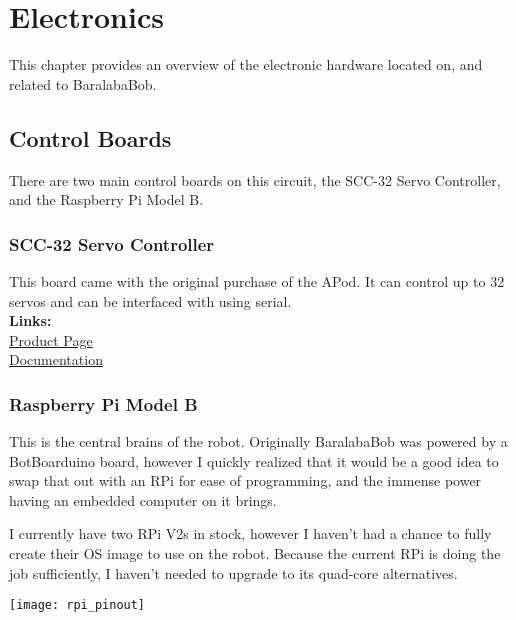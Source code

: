 	\chapter{Electronics}
		This chapter provides an overview of the electronic hardware located on, and related to BaralabaBob.
		\pagebreak
		
		\section{Control Boards}
        	\label{Controllers}
			There are two main control boards on this circuit, the SCC-32 Servo Controller, and the Raspberry Pi Model B.
			
			\subsection{SCC-32 Servo Controller}
				This board came with the original purchase of the APod. It can control up to 32 servos and can be interfaced with using serial.\\
				
				\textbf{Links:}\\
				\href{http://www.lynxmotion.com/p-395-ssc-32-servo-controller.aspx}{Product Page}\\
				\href{http://www.lynxmotion.com/s/html/build136.htm}{Documentation}
				
			\subsection{Raspberry Pi Model B}
				This is the central brains of the robot. Originally BaralabaBob was powered by a BotBoarduino board, however I quickly realized that it would be a good idea to swap that out with an RPi for ease of programming, and the immense power having an embedded computer on it brings.
                
                I currently have two RPi V2s in stock, however I haven't had a chance to fully create their OS image to use on the robot. Because the current RPi is doing the job sufficiently, I haven't needed to upgrade to its quad-core alternatives.
				
				\centerline{\texttt{[image: rpi\_pinout]}}
                \vspace{10pt}
				
